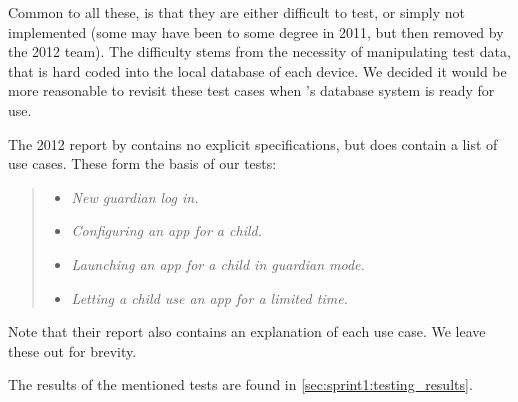 Common to all these, is that they are either difficult to test, or simply not implemented (some may have been to some degree in 2011, but then removed by the 2012 team).
The difficulty stems from the necessity of manipulating test data, that is hard coded into the local database of each device. 
We decided it would be more reasonable to revisit these test cases when \giraf's database system is ready for use.

The 2012 report by \citet{launcher2012} contains no explicit specifications, but does contain a list of use cases. 
These form the basis of our tests:

\begin{quote}
\begin{itemize}
	\item \textit{New guardian log in.}
	\item \textit{Configuring an app for a child.}
	\item \textit{Launching an app for a child in guardian mode.}
	\item \textit{Letting a child use an app for a limited time.}
\end{itemize}
\end{quote}

Note that their report also contains an explanation of each use case. 
We leave these out for brevity.

The results of the mentioned tests are found in \cref{sec:sprint1:testing_results}.